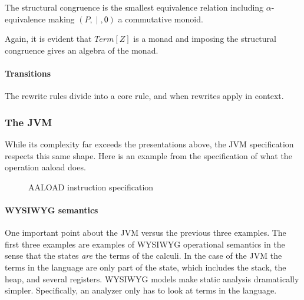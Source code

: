 The structural congruence is the smallest equivalence relation including $\alpha$-equivalence making $(P,\;\mathsf{|}\;,\mathsf{0})$ a commutative monoid.

Again, it is evident that $Term[Z]$ is a monad and imposing the structural congruence gives an algebra of the monad.

\paragraph{Transitions}
The rewrite rules divide into a core rule, and when rewrites apply in
context.

\pagebreak
\subsubsection{The JVM}

While its complexity far exceeds the presentations above, the JVM specification respects this same shape. Here is an example from the specification of what the operation aaload does.

\begin{figure}[h!]
  \caption{AALOAD instruction specification}
  \label{fig:AALOADSpec}
\end{figure}

\paragraph{WYSIWYG semantics}One important point about the JVM versus the previous three
examples. The first three examples are examples of WYSIWYG operational
semantics in the sense that the states \emph{are} the terms of the
calculi. In the case of the JVM the terms in the language are only
part of the state, which includes the stack, the heap, and several
registers. WYSIWYG models make static analysis dramatically
simpler. Specifically, an analyzer only has to look at terms in the
language.
